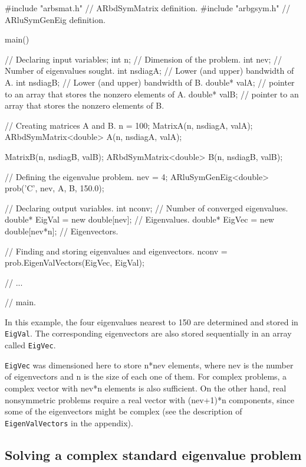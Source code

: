 \begin{cppcode}
#include "arbsmat.h"   // ARbdSymMatrix definition.
#include "arbgsym.h"   // ARluSymGenEig definition.

main()
{
	// Declaring input variables;
	int     n;           // Dimension of the problem.
	int     nev;         // Number of eigenvalues sought.
	int     nsdiagA;     // Lower (and upper) bandwidth of A.
	int     nsdiagB;     // Lower (and upper) bandwidth of B.
	double* valA;        // pointer to an array that stores the nonzero elements of A.
	double* valB;        // pointer to an array that stores the nonzero elements of B.
	
	// Creating matrices A and B.
	n   = 100;
	MatrixA(n, nsdiagA, valA);
	ARbdSymMatrix<double> A(n, nsdiagA, valA);
	
	MatrixB(n, nsdiagB, valB);
	ARbdSymMatrix<double> B(n, nsdiagB, valB);
	
	// Defining the eigenvalue problem. 
	nev = 4;
	ARluSymGenEig<double> prob('C', nev, A, B, 150.0);
	
	// Declaring output variables.
	int     nconv;                      // Number of converged eigenvalues.
	double* EigVal = new double[nev];   // Eigenvalues.
	double* EigVec = new double[nev*n]; // Eigenvectors.
	
	// Finding and storing eigenvalues and eigenvectors.
	nconv = prob.EigenValVectors(EigVec, EigVal); 
	
	// ... 
	
} // main.
\end{cppcode}

In this example, the four eigenvalues nearest to 150 are determined and stored in \texttt{EigVal}. The corresponding eigenvectors are also stored sequentially in an array called \texttt{EigVec}.

\texttt{EigVec} was dimensioned here to store n*nev elements, where nev is the number of eigenvectors and n is the size of each one of them. For complex problems, a complex vector with nev*n elements is also sufficient. On the other hand, real nonsymmetric problems require a real vector with (nev+1)*n components, since some of the eigenvectors might be complex (see the description of \texttt{EigenValVectors} in the appendix). 

\subsection{Solving a complex standard eigenvalue problem}

